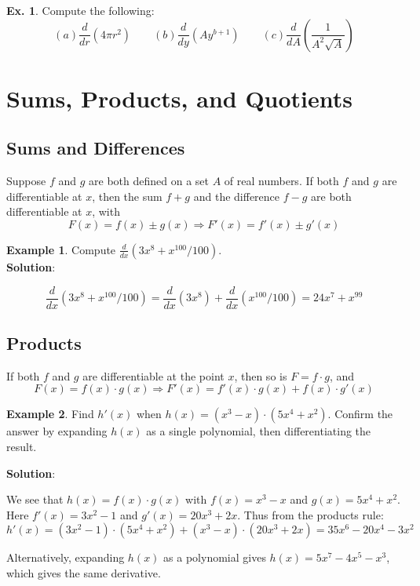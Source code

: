\documentclass[10pt,a4paper]{book}
\theoremstyle{definition}\newtheorem{definition}{Definition}
\theoremstyle{definition}\newtheorem{fact}{Fact}
\theoremstyle{definition}\newtheorem{ex}{Ex.}
\theoremstyle{definition}\newtheorem{project}{Project}
\theoremstyle{definition}\newtheorem{problem}{Problem}
\theoremstyle{definition}\newtheorem{example}{Example}
\numberwithin{theorem}{chapter}
\numberwithin{corollary}{chapter}
\numberwithin{assumption}{chapter}
\numberwithin{definition}{chapter}
\numberwithin{prop}{chapter}
\numberwithin{notation}{chapter}
\numberwithin{problem}{chapter}
\numberwithin{example}{chapter}
\numberwithin{fact}{chapter}
\numberwithin{ex}{chapter}
\begin{document}
	\begin{ex}
		Compute the following:
		\begin{equation*}
			(a) \frac{d}{dr}(4\pi r^2) \qquad
			(b) \frac{d}{dy} (Ay^{b+1}) \qquad
			(c) \frac{d}{dA} \left( \frac{1}{A^2 \sqrt{A}} \right)
		\end{equation*}
	\end{ex}
	
	\section{Sums, Products, and Quotients}
	
	\subsection{Sums and Differences}
	Suppose $f$ and $g$ are both defined on a set $A$ of real numbers. If both $f$ and $g$ are differentiable at $x$, then the sum $f + g$ and the difference $f - g$ are both differentiable at $x$, with
	$$F(x) = f(x) \pm g(x) \Rightarrow F'(x) = f'(x) \pm g'(x)$$
	
	\begin{example}
		Compute $\frac{d}{dx} (3x^8+x^{100}/100)$.
		\\
		\textbf{Solution}:
		
		$$\frac{d}{dx} (3x^8+x^{100}/100) = \frac{d}{dx} (3x^8) + \frac{d}{dx}(x^{100}/100) = 24x^7 + x^{99}$$
	\end{example}
	
	\subsection{Products}
	
	If both $f$ and $g$ are differentiable at the point $x$, then so is $F = f \cdot g$, and
	$$F(x) = f(x) \cdot g(x) \Rightarrow  F'(x) = f'(x) \cdot g(x) + f(x) \cdot g'(x)$$
	
	\begin{example}
		Find $h'(x)$ when $h(x)=(x^3 -x)·(5x^4 +x^2)$. Confirm the answer by expanding $h(x)$ as a single polynomial, then differentiating the result.
		
		\textbf{Solution}:
		
		We see that $h(x)=f(x) \cdot g(x)$ with $f(x)=x^3 -x$ and $g(x)=5x^4 +x^2$. Here $f'(x) = 3x^2 - 1$ and $g'(x) = 20x^3 + 2x$. Thus from the products rule:
		$$h'(x) = (3x^2-1) \cdot (5x^4+x^2) + (x^3-x) \cdot (20x^3+2x) = 35x^6 - 20x^4 - 3x^2$$
		
		Alternatively, expanding $h(x)$ as a polynomial gives $h(x) = 5x^7 - 4x^5 - x^3$, which gives the same derivative.
	\end{example}
	
\end{document}
